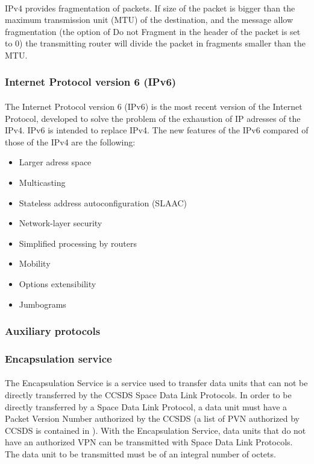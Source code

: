 \paragraph{}IPv4 provides fragmentation of packets. If size of the packet is bigger than the maximum transmission unit (MTU) of the destination, and the message allow fragmentation (the option of Do not Fragment in the header of the packet is set to 0) the transmitting router will divide the packet in fragments smaller than the MTU.

\subsubsection{Internet Protocol version 6 (IPv6)\cite{IPv6}}
\paragraph{}The Internet Protocol version 6 (IPv6) is the most recent version of the Internet Protocol, developed to solve the problem of the exhaustion of IP adresses of the IPv4. IPv6 is intended to replace IPv4. The new features of the IPv6 compared of those of the IPv4 are the following:
\begin{itemize}
	\item Larger adress space 
	\item Multicasting
	\item Stateless address autoconfiguration (SLAAC)
	\item Network-layer security
	\item Simplified processing by routers
	\item Mobility
	\item Options extensibility
	\item Jumbograms
\end{itemize}

\subsubsection{Auxiliary protocols}

\subsubsection{Encapsulation service\cite{ES}}
\paragraph{}The Encapsulation Service is a service used to transfer data units that can not be directly transferred by the CCSDS Space Data Link Protocols. In order to be directly transferred by a Space Data Link Protocol, a data unit must have a Packet Version Number authorized by the CCSDS (a list of PVN authorized by CCSDS is contained in \cite{SANAPVN}). With the Encapsulation Service, data units that do not have an authorized VPN can be transmitted with Space Data Link Protocols. The data unit to be transmitted must be of an integral number of octets.
